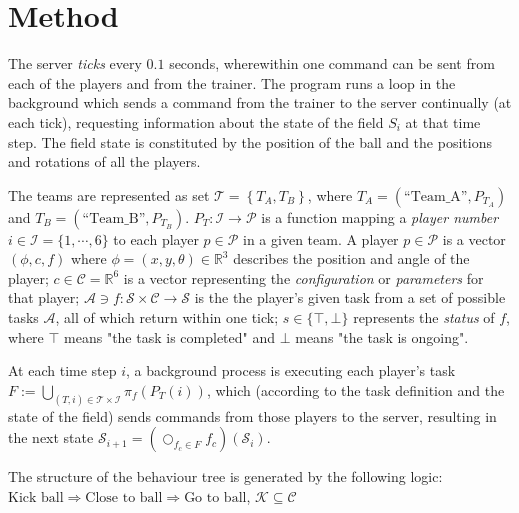 \documentclass[10pt,a4paper]{article}
\begin{document}
\section{Method}

The server \textit{ticks} every \(0.1\) seconds, wherewithin one command can be sent from each of the players and from the trainer. The program runs a loop in the background which sends a command from the trainer to the server continually (at each tick), requesting information about the state of the field \(S_i\) at that time step. The field state is constituted by the position of the ball and the positions and rotations of all the players.

The teams are represented as set \(\mathcal{T} = \left\{ T_A, T_B \right\}\), where \(T_A = (\text{``Team\_A''}, P_{T_A})\) and \(T_B = (\text{``Team\_B''}, P_{T_B})\). \(P_T : \mathcal{I} \to \mathcal{P} \) is a function mapping a \textit{player number} \(i\in \mathcal{I} = \{1,\cdots,6\}\) to each player \(p \in \mathcal{P}\) in a given team. A player \(p\in \mathcal{P}\) is a vector \((\phi, c, f)\) where \(\phi = (x, y, \theta) \in \mathbb{R}^3\) describes the position and angle of the player; \(c \in \mathcal{C} = \mathbb{R}^6\) is a vector representing the \textit{configuration} or \textit{parameters} for that player; \(\mathcal{A} \ni f:\mathcal{S}\times \mathcal{C} \to \mathcal{S}\) is the the player's given task from a set of possible tasks \(\mathcal{A}\), all of which return within one tick; \(s \in \{\top,\bot\}\) represents the \textit{status} of \(f\), where \(\top\) means "the task is completed" and \(\bot\) means "the task is ongoing".

At each time step \(i\), a background process is executing each player's task \(F := \bigcup_{(T,i)\in\mathcal{T} \times \mathcal{I}} \pi_f(P_T(i)) \), which (according to the task definition and the state of the field) sends commands from those players to the server, resulting in the next state \(\mathcal{S}_{i+1} = \left(\bigcirc_{f_c\in F} f_c\right)(\mathcal{S}_i)\).

The structure of the behaviour tree is generated by the following logic: \(\text{Kick ball} \Rightarrow \text{Close to ball} \Rightarrow \text{Go to ball}\), \(\mathscr{K} \subseteq \mathscr{C}\)
\end{document}
